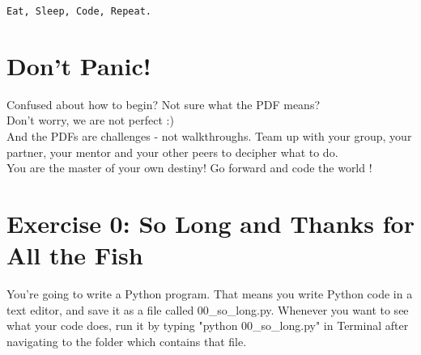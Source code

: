 \documentclass{42-en}
\begin{document}
\centerline{\texttt{Eat, Sleep, Code, Repeat.}}


\chapter{Don't Panic!}

Confused about how to begin? Not sure what the PDF means?\\

Don't worry, we are not perfect :)\\

And the PDFs are challenges - not walkthroughs. Team up with your group, your partner,
your mentor and your other peers to decipher what to do.\\

You are the master of your own destiny! Go forward and code the world ! 


\startexercices


\chapter{Exercise 0: So Long and Thanks for All the Fish}
\makeheaderfiles

You're going to write a Python program. That means you write Python code in a text editor, and save it as a file called 00\_so\_long.py. Whenever you want to see what your code does, run it by typing "python 00\_so\_long.py" in Terminal after navigating to the folder which contains that file.\\
\end{document}
